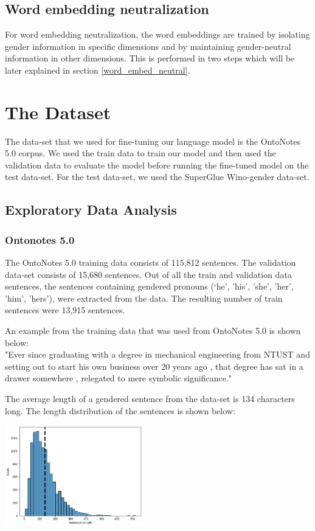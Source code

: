 \documentclass[10pt]{article}
\begin{document}
\subsection{Word embedding neutralization}
For word embedding neutralization, the word embeddings are trained by isolating gender information in specific dimensions and by maintaining gender-neutral information in other dimensions. This is performed in two steps which will be later explained in section \ref{word_embed_neutral}.

\section{The Dataset}
The data-set that we used for fine-tuning our language model is the OntoNotes 5.0 corpus. We used the train data to train our model and then used the validation data to evaluate the model before running the fine-tuned model on the test data-set. 
For the test data-set, we used the SuperGlue Wino-gender data-set. 

\subsection{Exploratory Data Analysis}
\subsubsection{Ontonotes 5.0} \label{eda_ontonotes}
The OntoNotes 5.0 training data consists of 115,812 sentences. The validation data-set consists of 15,680 sentences. Out of all the train and validation data sentences, the sentences containing gendered pronouns (‘he', 'his', 'she', 'her', 'him', 'hers’), were extracted from the data. The resulting number of train sentences were 13,915 sentences. 

An example from the training data that was used from OntoNotes 5.0 is shown below:\\
"Ever since graduating with a degree in mechanical engineering from NTUST and setting out to start his own business over 20 years ago , that degree has sat in a drawer somewhere , relegated to mere symbolic significance."

The average length of a gendered sentence from the data-set is 134 characters long. The length distribution of the sentences is shown below:

\includegraphics[width=6cm,scale=1.0]{final-report-images/eda3.png}
\end{document}
